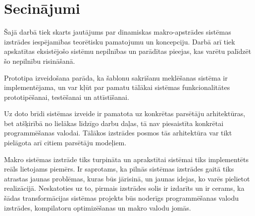 \documentclass[12pt, a4paper]{article}
\begin{document}
\titullapa



\setcounter{tocdepth}{4}
\tableofcontents















\section*{Secinājumi}
\label{s:conclusions}

Šajā darbā tiek skarts jautājums par dinamiskas makro-apstrādes sistēmas izstrādes iespējamības teorētisku pamatojumu un koncepciju. Darbā arī tiek apskatītas eksistējošo sistēmu nepilnības un parādītas pieejas, kas varētu palīdzēt šo nepilnību risināšanā.

Prototipa izveidošana parāda, ka šablonu sakrišanu meklēšanas sistēma ir implementējama, un var kļūt par pamatu tālākai sistēmas funkcionalitātes prototipēšanai, testēšanai un attīstīšanai.

Uz doto brīdi sistēmas izveide ir pamatota uz konkrētas parsētāju arhitektūras, bet atšķirībā no lielākas līdzīgo darbu daļas, tā nav piesaistīta konkrētai programmēšanas valodai. Tālākos izstrādes posmos tās arhitektūra var tikt pielāgota arī citiem parsētāju modeļiem.

Makro sistēmas izstrāde tiks turpināta un aprakstītai sistēmai tiks implementēts reāls lietojams piemērs. Ir saprotams, ka pilnās sistēmas izstrādes gaitā tiks atrastas jaunas problēmas, kuras būs jārisinā, un jaunas idejas, ko varēs pielietot realizācijā. Neskatoties uz to, pirmais izstrādes solis ir izdarīts un ir cerams, ka šādas transformācijas sistēmas projekts būs noderīgs programmēšanas valodu izstrādes, kompilatoru optimizēšanas un makro valodu jomās.

\appendixtitleon
\appendixtitletocon
\end{document}
